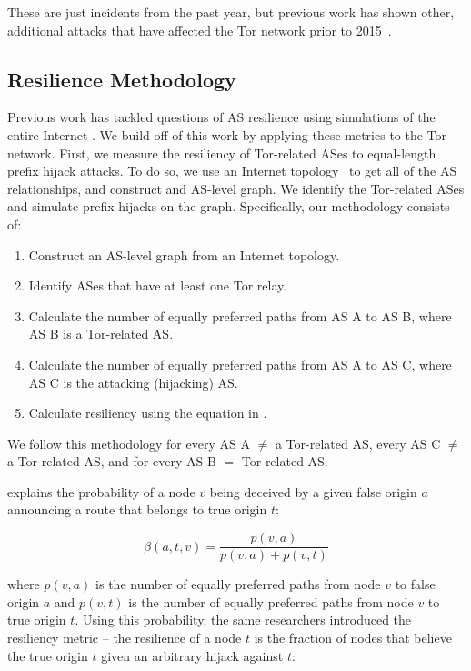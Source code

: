 These are just incidents from the past year, but previous work has shown other, additional attacks that have affected the Tor network prior to 2015~\cite{sun2015raptor}.

\subsection{Resilience Methodology}

Previous work has tackled questions of AS resilience using simulations of the entire Internet \cite{lad2007understanding}.  We build off of this work by applying these metrics to the Tor network.  First, we measure the resiliency of Tor-related ASes to equal-length prefix hijack attacks.  To do so, we use an Internet topology~\cite{caida} to get all of the AS relationships, and construct and AS-level graph.  We identify the Tor-related ASes and simulate prefix hijacks on the graph. Specifically, our methodology consists of:

\begin{enumerate}
\item Construct an AS-level graph from an Internet topology.
\item Identify ASes that have at least one Tor relay.
\item Calculate the number of equally preferred paths from AS A to AS B, where AS B is a Tor-related AS.
\item Calculate the number of equally preferred paths from AS A to AS C, where AS C is the attacking (hijacking) AS.
\item Calculate resiliency using the equation in \cite{lad2007understanding}.
\end{enumerate}

We follow this methodology for every AS A $\neq$ a Tor-related AS, every AS C $\neq$ a Tor-related AS, and for every AS B $=$ Tor-related AS.

\cite{lad2007understanding} explains the probability of a node $v$ being deceived by a given false origin $a$ announcing a route that belongs to true origin $t$:

\[\beta(a,t,v) = \frac{p(v,a)}{p(v,a) + p(v,t)}\]

where $p(v,a)$ is the number of equally preferred paths from node $v$ to false origin $a$ and $p(v,t)$ is the number of equally preferred paths from node $v$ to true origin $t$.  Using this probability, the same researchers introduced the resiliency metric -- the resilience of a node $t$ is the fraction of nodes that believe the true origin $t$ given an arbitrary  hijack against $t$:

